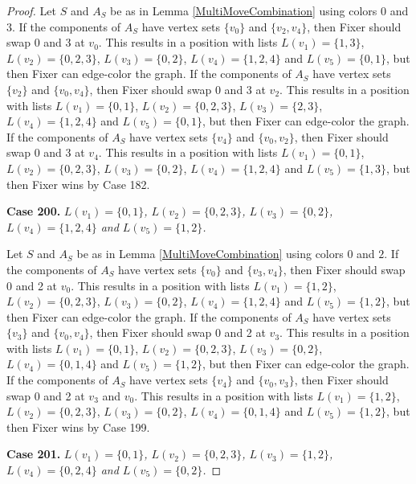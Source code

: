 \documentclass[12pt]{amsart}
\theoremstyle{plain}
\theoremstyle{definition}
\theoremstyle{remark}
\begin{document}
\begin{proof}
Let $S$ and $A_S$ be as in Lemma \ref{MultiMoveCombination} using colors $0$ and $3$. If the components of $A_S$ have vertex sets $\{v_0\}$ and $\{v_2, v_4\}$, then Fixer should swap 0 and 3 at $v_0$. This results in a position with lists $L(v_1) = \{1, 3\}$, $L(v_2) = \{0, 2, 3\}$, $L(v_3) = \{0, 2\}$, $L(v_4) = \{1, 2, 4\}$ and $L(v_5) = \{0, 1\}$, but then Fixer can edge-color the graph.
If the components of $A_S$ have vertex sets $\{v_2\}$ and $\{v_0, v_4\}$, then Fixer should swap 0 and 3 at $v_2$. This results in a position with lists $L(v_1) = \{0, 1\}$, $L(v_2) = \{0, 2, 3\}$, $L(v_3) = \{2, 3\}$, $L(v_4) = \{1, 2, 4\}$ and $L(v_5) = \{0, 1\}$, but then Fixer can edge-color the graph.
If the components of $A_S$ have vertex sets $\{v_4\}$ and $\{v_0, v_2\}$, then Fixer should swap 0 and 3 at $v_4$. This results in a position with lists $L(v_1) = \{0, 1\}$, $L(v_2) = \{0, 2, 3\}$, $L(v_3) = \{0, 2\}$, $L(v_4) = \{1, 2, 4\}$ and $L(v_5) = \{1, 3\}$, but then Fixer wins by Case 182.

\noindent\textbf{Case 200.  }\textit{$L(v_1) = \{0, 1\}$, $L(v_2) = \{0, 2, 3\}$, $L(v_3) = \{0, 2\}$, $L(v_4) = \{1, 2, 4\}$ and $L(v_5) = \{1, 2\}$.}

Let $S$ and $A_S$ be as in Lemma \ref{MultiMoveCombination} using colors $0$ and $2$. If the components of $A_S$ have vertex sets $\{v_0\}$ and $\{v_3, v_4\}$, then Fixer should swap 0 and 2 at $v_0$. This results in a position with lists $L(v_1) = \{1, 2\}$, $L(v_2) = \{0, 2, 3\}$, $L(v_3) = \{0, 2\}$, $L(v_4) = \{1, 2, 4\}$ and $L(v_5) = \{1, 2\}$, but then Fixer can edge-color the graph.
If the components of $A_S$ have vertex sets $\{v_3\}$ and $\{v_0, v_4\}$, then Fixer should swap 0 and 2 at $v_3$. This results in a position with lists $L(v_1) = \{0, 1\}$, $L(v_2) = \{0, 2, 3\}$, $L(v_3) = \{0, 2\}$, $L(v_4) = \{0, 1, 4\}$ and $L(v_5) = \{1, 2\}$, but then Fixer can edge-color the graph.
If the components of $A_S$ have vertex sets $\{v_4\}$ and $\{v_0, v_3\}$, then Fixer should swap 0 and 2 at $v_3$ and $v_0$. This results in a position with lists $L(v_1) = \{1, 2\}$, $L(v_2) = \{0, 2, 3\}$, $L(v_3) = \{0, 2\}$, $L(v_4) = \{0, 1, 4\}$ and $L(v_5) = \{1, 2\}$, but then Fixer wins by Case 199.

\noindent\textbf{Case 201.  }\textit{$L(v_1) = \{0, 1\}$, $L(v_2) = \{0, 2, 3\}$, $L(v_3) = \{1, 2\}$, $L(v_4) = \{0, 2, 4\}$ and $L(v_5) = \{0, 2\}$.}


\end{proof}
\end{document}

